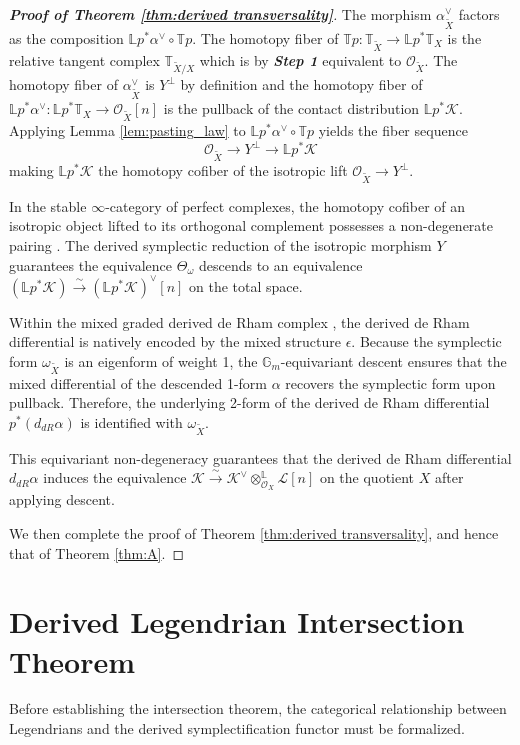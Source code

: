 \documentclass[reqno]{amsart}
\theoremstyle{definition}
\theoremstyle{remark}
\newcommand{\LL}{\mathbb{L}}
\newcommand{\TT}{\mathbb{T}}
\newcommand{\Gm}{\mathbb{G}_m}
\newcommand{\cO}{\mathcal{O}}
\newcommand{\cL}{\mathcal{L}}
\newcommand{\cK}{\mathcal{K}}
\begin{document}
{\begin{proof}[\textbf{Proof of Theorem \ref{thm:derived transversality}}]
  The morphism $\alpha_{\widetilde{X}}^\vee$ factors as the composition $\mathbb{L}p^*\alpha^\vee \circ \mathbb{T}p$. 
  The homotopy fiber of $\TT p\colon \TT_{\widetilde{X}}\to \LL p^*\TT_{X}$ is the relative tangent complex $\TT_{\widetilde{X}/X}$ which is by \textbf{\textit{Step 1}} equivalent to $\cO_{\widetilde{X}}$. The homotopy fiber of $\alpha_{\widetilde{X}}^\vee$ is $Y^\perp$ by definition and the homotopy fiber of $\LL p^*\alpha^\vee\colon \LL p^* \TT_X \to \cO_{\widetilde{X}}[n]$ is the pullback of the contact distribution $\LL p^*\cK$. Applying Lemma \ref{lem:pasting_law} to $\LL p^* \alpha^\vee \circ \TT p$ yields the fiber sequence
  \begin{equation*}
    \cO_{\widetilde{X}}\to Y^\perp \to \LL p^*\cK   
  \end{equation*}
  making $\LL p^*\cK$ the homotopy cofiber of the isotropic lift $\cO_{\widetilde{X}}\to Y^\perp$.
  
  In the stable $\infty$-category of perfect complexes, the homotopy cofiber of an isotropic object lifted to
  its orthogonal complement possesses a non-degenerate pairing \cite[Section 1.1.2]{LurieHA}.
  The derived symplectic reduction of the isotropic morphism $Y$ guarantees the equivalence $\Theta_\omega$ descends to an equivalence
  $(\mathbb{L}p^*\cK) \xrightarrow{\sim} (\mathbb{L}p^*\cK)^\vee[n]$
  on the total space. 

  Within the mixed graded derived de Rham complex \cite[Section 1.4.1]{CPTVV}, the derived de Rham differential is natively encoded by the mixed structure $\epsilon$. Because the symplectic form $\omega_{\widetilde{X}}$ is an eigenform of weight 1, the $\Gm$-equivariant descent ensures that the mixed differential of the descended 1-form $\alpha$ recovers the symplectic form upon pullback. Therefore, the underlying 2-form of the derived de Rham differential $p^*(d_{dR}\alpha)$ is identified with $\omega_{\widetilde{X}}$.
  
  This equivariant non-degeneracy guarantees that the derived de Rham differential $d_{dR}\alpha$ induces the equivalence $\cK \xrightarrow{\sim} \cK^\vee \otimes^{\mathbb{L}}_{\cO_X} \cL[n]$ on the quotient $X$ after applying descent.
  
We then complete the proof of Theorem \ref{thm:derived transversality}, and hence that of Theorem \ref{thm:A}.
\end{proof}

\section{Derived Legendrian Intersection Theorem}\label{sec:legendrian}
Before establishing the intersection theorem, the categorical
relationship between Legendrians and the derived symplectification
functor must be formalized. 

}
\end{document}
